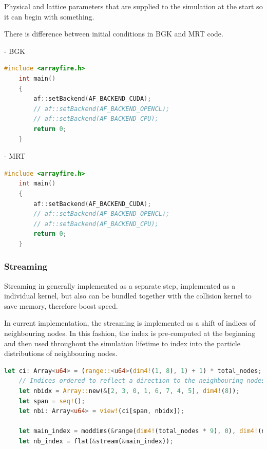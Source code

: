 Physical and lattice parameters that are supplied to the simulation at the start so it can begin with something.

There is difference between initial conditions in BGK and MRT code.

- BGK \\

\begin{lstlisting}[language=Cpp, caption=C++ code for setting different computing backends., label=cpp-backends]
	#include <arrayfire.h>
	int main()
	{
		af::setBackend(AF_BACKEND_CUDA);
		// af::setBackend(AF_BACKEND_OPENCL);
		// af::setBackend(AF_BACKEND_CPU);
		return 0;
	}
\end{lstlisting}

- MRT \\

\begin{lstlisting}[language=Cpp, caption=C++ code for setting different computing backends., label=cpp-backends]
	#include <arrayfire.h>
	int main()
	{
		af::setBackend(AF_BACKEND_CUDA);
		// af::setBackend(AF_BACKEND_OPENCL);
		// af::setBackend(AF_BACKEND_CPU);
		return 0;
	}
\end{lstlisting}

\subsubsection{Streaming}

Streaming in generally implemented as a separate step, implemented as a individual kernel, but also can be bundled together with the collision kernel to save memory, therefore boost speed.

In current implementation, the streaming is implemented as a shift of indices of neighbouring nodes. In this fashion, the index is pre-computed at the beginning and then used throughout the simulation lifetime to index into the particle distributions of neighbouring nodes.

\begin{lstlisting}[language=Rust, caption=Pre-computed streaming step in the way of shifting indices during the program intialization phase., label=rust-nb-index]
	let ci: Array<u64> = (range::<u64>(dim4!(1, 8), 1) + 1) * total_nodes;
	// Indices ordered to reflect a direction to the neighbouring nodes
	let nbidx = Array::new(&[2, 3, 0, 1, 6, 7, 4, 5], dim4!(8));
	let span = seq!();
	let nbi: Array<u64> = view!(ci[span, nbidx]);
	
	let main_index = moddims(&range(dim4!(total_nodes * 9), 0), dim4!(nx, ny, 9));
	let nb_index = flat(&stream(&main_index));
\end{lstlisting}

